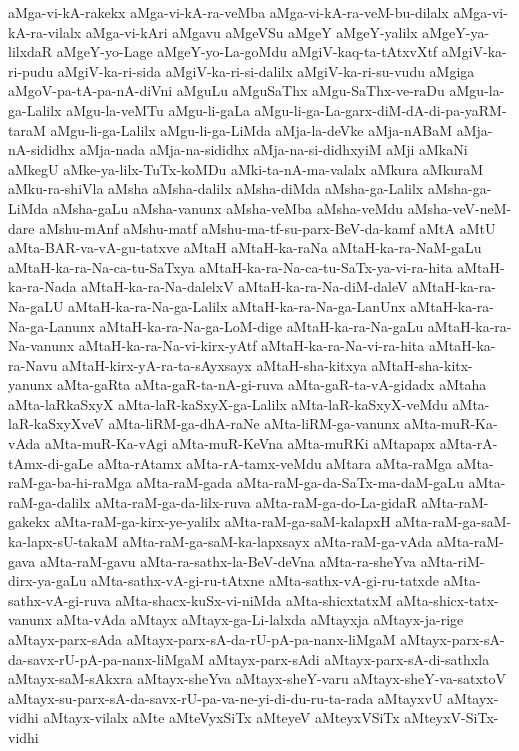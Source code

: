{aMga-vi-kA-rakekx
aMga-vi-kA-ra-veMba
aMga-vi-kA-ra-veM-bu-dilalx
aMga-vi-kA-ra-vilalx
aMga-vi-kAri
aMgavu
aMgeVSu
aMgeY
aMgeY-yalilx
aMgeY-ya-lilxdaR
aMgeY-yo-Lage
aMgeY-yo-La-goMdu
aMgiV-kaq-ta-tAtxvXtf
aMgiV-ka-ri-pudu
aMgiV-ka-ri-sida
aMgiV-ka-ri-si-dalilx
aMgiV-ka-ri-su-vudu
aMgiga
aMgoV-pa-tA-pa-nA-diVni
aMguLu
aMguSaThx
aMgu-SaThx-ve-raDu
aMgu-la-ga-Lalilx
aMgu-la-veMTu
aMgu-li-gaLa
aMgu-li-ga-La-garx-diM-dA-di-pa-yaRM-taraM
aMgu-li-ga-Lalilx
aMgu-li-ga-LiMda
aMja-la-deVke
aMja-nABaM
aMja-nA-sididhx
aMja-nada
aMja-na-sididhx
aMja-na-si-didhxyiM
aMji
aMkaNi
aMkegU
aMke-ya-lilx-TuTx-koMDu
aMki-ta-nA-ma-valalx
aMkura
aMkuraM
aMku-ra-shiVla
aMsha
aMsha-dalilx
aMsha-diMda
aMsha-ga-Lalilx
aMsha-ga-LiMda
aMsha-gaLu
aMsha-vanunx
aMsha-veMba
aMsha-veMdu
aMsha-veV-neM-dare
aMshu-mAnf
aMshu-matf
aMshu-ma-tf-su-parx-BeV-da-kamf
aMtA
aMtU
aMta-BAR-va-vA-gu-tatxve
aMtaH
aMtaH-ka-raNa
aMtaH-ka-ra-NaM-gaLu
aMtaH-ka-ra-Na-ca-tu-SaTxya
aMtaH-ka-ra-Na-ca-tu-SaTx-ya-vi-ra-hita
aMtaH-ka-ra-Nada
aMtaH-ka-ra-Na-dalelxV
aMtaH-ka-ra-Na-diM-daleV
aMtaH-ka-ra-Na-gaLU
aMtaH-ka-ra-Na-ga-Lalilx
aMtaH-ka-ra-Na-ga-LanUnx
aMtaH-ka-ra-Na-ga-Lanunx
aMtaH-ka-ra-Na-ga-LoM-dige
aMtaH-ka-ra-Na-gaLu
aMtaH-ka-ra-Na-vanunx
aMtaH-ka-ra-Na-vi-kirx-yAtf
aMtaH-ka-ra-Na-vi-ra-hita
aMtaH-ka-ra-Navu
aMtaH-kirx-yA-ra-ta-sAyxsayx
aMtaH-sha-kitxya
aMtaH-sha-kitx-yanunx
aMta-gaRta
aMta-gaR-ta-nA-gi-ruva
aMta-gaR-ta-vA-gidadx
aMtaha
aMta-laRkaSxyX
aMta-laR-kaSxyX-ga-Lalilx
aMta-laR-kaSxyX-veMdu
aMta-laR-kaSxyXveV
aMta-liRM-ga-dhA-raNe
aMta-liRM-ga-vanunx
aMta-muR-Ka-vAda
aMta-muR-Ka-vAgi
aMta-muR-KeVna
aMta-muRKi
aMtapapx
aMta-rA-tAmx-di-gaLe
aMta-rAtamx
aMta-rA-tamx-veMdu
aMtara
aMta-raMga
aMta-raM-ga-ba-hi-raMga
aMta-raM-gada
aMta-raM-ga-da-SaTx-ma-daM-gaLu
aMta-raM-ga-dalilx
aMta-raM-ga-da-lilx-ruva
aMta-raM-ga-do-La-gidaR
aMta-raM-gakekx
aMta-raM-ga-kirx-ye-yalilx
aMta-raM-ga-saM-kalapxH
aMta-raM-ga-saM-ka-lapx-sU-takaM
aMta-raM-ga-saM-ka-lapxsayx
aMta-raM-ga-vAda
aMta-raM-gava
aMta-raM-gavu
aMta-ra-sathx-la-BeV-deVna
aMta-ra-sheYva
aMta-riM-dirx-ya-gaLu
aMta-sathx-vA-gi-ru-tAtxne
aMta-sathx-vA-gi-ru-tatxde
aMta-sathx-vA-gi-ruva
aMta-shacx-kuSx-vi-niMda
aMta-shicxtatxM
aMta-shicx-tatx-vanunx
aMta-vAda
aMtayx
aMtayx-ga-Li-lalxda
aMtayxja
aMtayx-ja-rige
aMtayx-parx-sAda
aMtayx-parx-sA-da-rU-pA-pa-nanx-liMgaM
aMtayx-parx-sA-da-savx-rU-pA-pa-nanx-liMgaM
aMtayx-parx-sAdi
aMtayx-parx-sA-di-sathxla
aMtayx-saM-sAkxra
aMtayx-sheYva
aMtayx-sheY-varu
aMtayx-sheY-va-satxtoV
aMtayx-su-parx-sA-da-savx-rU-pa-va-ne-yi-di-du-ru-ta-rada
aMtayxvU
aMtayx-vidhi
aMtayx-vilalx
aMte
aMteVyxSiTx
aMteyeV
aMteyxVSiTx
aMteyxV-SiTx-vidhi
}
